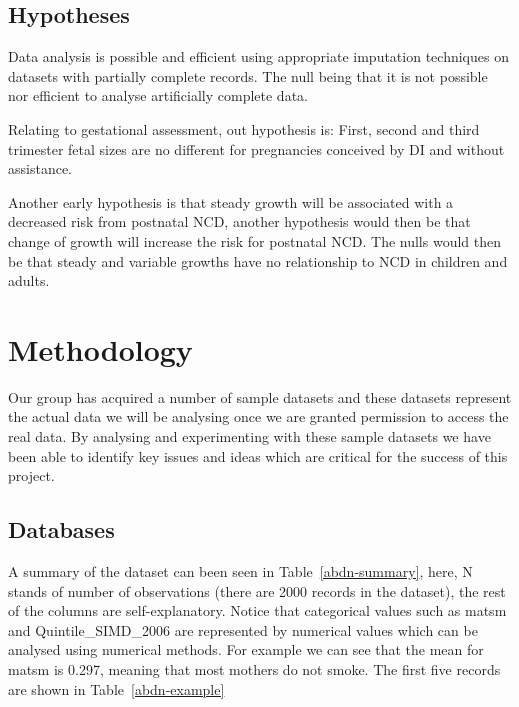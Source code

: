 \documentclass[bsc]{abdnthesis}
\begin{document}
\section{Hypotheses} %
\label{sec:hypothesis}
Data analysis is possible and efficient using appropriate imputation techniques on datasets with partially complete records. The null being that it is not possible nor efficient to analyse artificially complete data.

Relating to gestational assessment, out hypothesis is: First, second and third trimester fetal sizes are no different for pregnancies conceived by DI and without assistance.

Another early hypothesis is that steady growth will be associated with a decreased risk from postnatal NCD, another hypothesis would then be that change of growth will increase the risk for postnatal NCD. The nulls would then be that steady and variable growths have no relationship to NCD in children and adults.


\chapter{Methodology}
Our group has acquired a number of sample datasets and these datasets represent the actual data we will be analysing once we are granted permission to access the real data. By analysing and experimenting with these sample datasets we have been able to identify key issues and ideas which are critical for the success of this project.
\section{Databases} %
\label{sec:databases}
A summary of the dataset can been seen in Table~\ref{abdn-summary}, here, N stands of number of observations (there are 2000 records in the dataset), the rest of the columns are self-explanatory. Notice that categorical values such as matsm and Quintile\_SIMD\_2006 are represented by numerical values which can be analysed using numerical methods. For example we can see that the mean for matsm is 0.297, meaning that most mothers do not smoke. The first five records are shown in Table~\ref{abdn-example}
\end{document}
